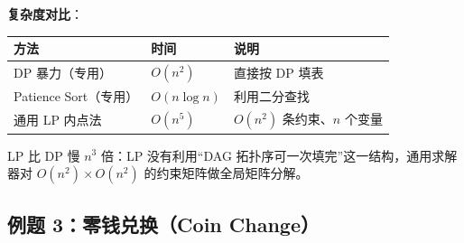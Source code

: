 \documentclass[12pt, a4paper]{ctexart}
\begin{document}
\begin{blackboard}
\textbf{复杂度对比}：

\begin{center}
\begin{tabular}{lll}
\toprule
方法 & 时间 & 说明 \\
\midrule
DP 暴力（专用） & $O(n^2)$ & 直接按 DP 填表 \\
Patience Sort（专用） & $O(n\log n)$ & 利用二分查找 \\
通用 LP 内点法 & $O(n^5)$ & $O(n^2)$ 条约束、$n$ 个变量 \\
\bottomrule
\end{tabular}
\end{center}

LP 比 DP 慢 $n^3$ 倍：LP 没有利用``DAG 拓扑序可一次填完''这一结构，通用求解器对 $O(n^2) \times O(n^2)$ 的约束矩阵做全局矩阵分解。

\end{blackboard}

\subsection{例题 3：零钱兑换（Coin Change）}
\end{document}
